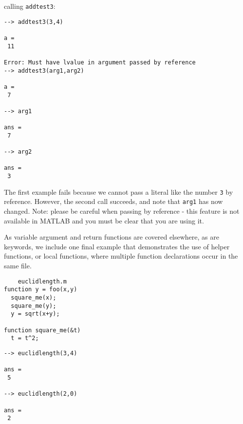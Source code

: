 calling \verb|addtest3|:
\begin{verbatim}
--> addtest3(3,4)

a = 
 11 

Error: Must have lvalue in argument passed by reference
--> addtest3(arg1,arg2)

a = 
 7 

--> arg1

ans = 
 7 

--> arg2

ans = 
 3 
\end{verbatim}
The first example fails because we cannot pass a literal like the
number \verb|3| by reference.  However, the second call succeeds, and
note that \verb|arg1| has now changed.  Note: please be careful when
passing by reference - this feature is not available in MATLAB
and you must be clear that you are using it.

As variable argument and return functions are covered elsewhere,
as are keywords, we include one final example that demonstrates
the use of helper functions, or local functions, where
multiple function declarations occur in the same file.
\begin{verbatim}
    euclidlength.m
function y = foo(x,y)
  square_me(x);
  square_me(y);
  y = sqrt(x+y);

function square_me(&t)
  t = t^2;
\end{verbatim}
\begin{verbatim}
--> euclidlength(3,4)

ans = 
 5 

--> euclidlength(2,0)

ans = 
 2 
\end{verbatim}
